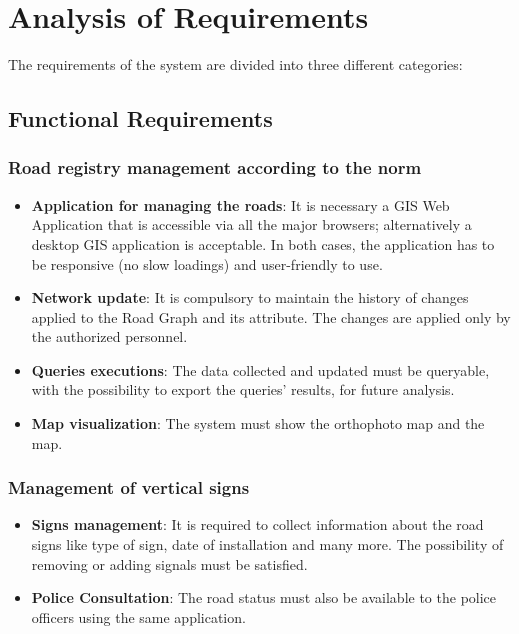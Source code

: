 \section{Analysis of Requirements}

The requirements of the system are divided into three different categories:

\subsection{Functional Requirements}
    \subsubsection{\textbf{Road registry management according to the norm}} 
    \begin{itemize}
    \item \textbf{Application for managing the roads}: It is necessary a GIS Web Application that is accessible via all the major browsers; alternatively a desktop GIS application is acceptable.
    In both cases, the application has to be responsive (no slow loadings) and user-friendly to use.
    \item \textbf{Network update}: It is compulsory to maintain the history of changes applied to the Road Graph and its attribute. The changes are applied only by the authorized personnel.
    \item \textbf{Queries executions}: The data collected and updated must be queryable, with the possibility to export the queries' results, for future analysis.
    \item \textbf{Map visualization}: The system must show the orthophoto map and the map.
    \end{itemize}

    
    \subsubsection{Management of vertical signs}
    \begin{itemize}
    \item \textbf{Signs management}: It is required to collect information about the road signs like type of sign, date of installation and many more. The possibility of removing or adding signals must be satisfied.
    \item \textbf{Police Consultation}: The road status must also be available to the police officers using the same application.
    \end{itemize}


